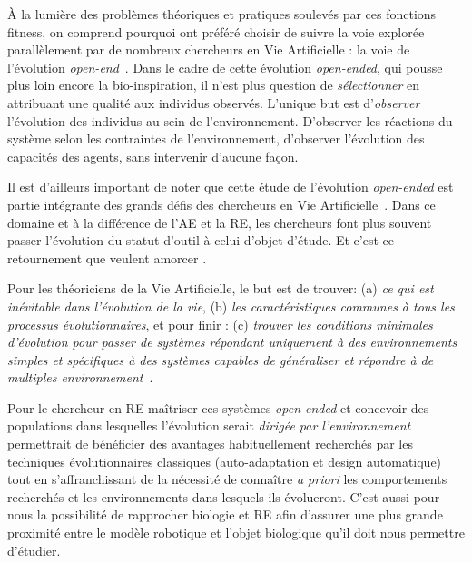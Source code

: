 \`A la lumière des problèmes théoriques et pratiques soulevés par ces fonctions fitness, on comprend pourquoi \cite{bredeche2012environmentdrivenopenende} ont préféré choisir de suivre la voie explorée parallèlement par de nombreux chercheurs en Vie Artificielle : la voie de l'évolution \emph{open-end}~\citep{ray91anapproachtothesynthesisoflife,adami94evolutionarylearninginthe2Dartificiallifesystemavida}. Dans le cadre de cette évolution \emph{open-ended}, qui pousse plus loin encore la bio-inspiration, il n'est plus question de \emph{sélectionner} en attribuant une qualité aux individus observés. L'unique but est d'\emph{observer} l'évolution des individus au sein de l'environnement. D'observer les réactions du système selon les contraintes de l'environnement, d'observer l'évolution des capacités des agents, sans intervenir d'aucune façon.

Il est d'ailleurs important de noter que cette étude de l'évolution \emph{open-ended} est partie intégrante des grands défis des chercheurs en Vie Artificielle~\citep{bedau2000openproblemsinartificiallife}. Dans ce domaine et à la différence de l'AE et la RE, les chercheurs font plus souvent passer l'évolution du statut d'outil à celui d'objet d'étude. Et c'est ce retournement que veulent amorcer \cite{bredeche11mcmds}.

Pour les théoriciens de la Vie Artificielle, le but est de trouver: (a) \emph{ce qui est inévitable dans l'évolution de la vie}, (b) \emph{les caractéristiques communes à tous les processus évolutionnaires}, et pour finir : (c) \emph{trouver les conditions minimales d'évolution pour passer de systèmes répondant uniquement à des environnements simples et spécifiques à des systèmes capables de généraliser et répondre à de multiples environnement}~\citep[voir respectivement les chapitres 3.6, 3.10 et 3.7 ]{bedau2000openproblemsinartificiallife}.

Pour le chercheur en RE maîtriser ces systèmes \emph{open-ended} et concevoir des populations dans lesquelles l'évolution serait \emph{dirigée par l'environnement} permettrait de bénéficier des avantages habituellement recherchés par les techniques évolutionnaires classiques (auto-adaptation et design automatique) tout en s'affranchissant de la nécessité de connaître \emph{a priori} les comportements recherchés et les environnements dans lesquels ils évolueront. C'est aussi pour nous la possibilité de rapprocher biologie et RE afin d'assurer une plus grande proximité entre le modèle robotique et l'objet biologique qu'il doit nous permettre d'étudier.

